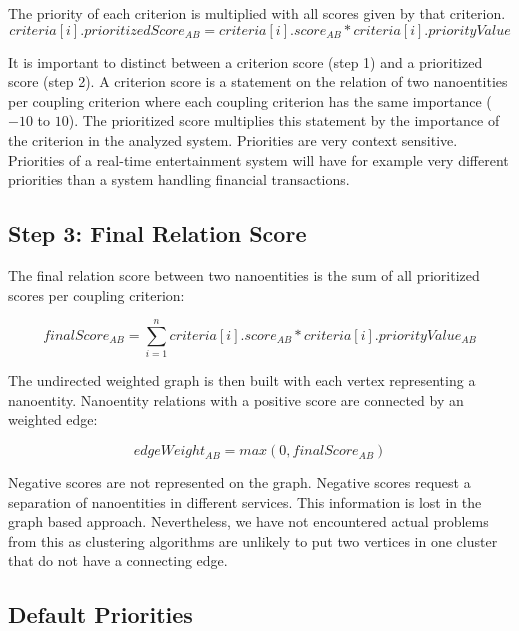 The priority of each criterion is multiplied with all scores given by that criterion. 
\begin{displaymath}
	criteria[i].prioritizedScore_{AB} = criteria[i].score_{AB} * criteria[i].priorityValue
\end{displaymath}

It is important to distinct between a criterion score (step 1) and a prioritized score (step 2). A criterion score is a statement on the relation of two nanoentities per coupling criterion where each coupling criterion has the same importance ($-10$ to $10$). The prioritized score multiplies this statement by the importance of the criterion in the analyzed system. Priorities are very context sensitive. Priorities of a real-time entertainment system will have for example very different priorities than a system handling financial transactions. 

\subsection{Step 3: Final Relation Score}

The final relation score between two nanoentities is the sum of all prioritized scores per coupling criterion: 

\begin{displaymath}
finalScore_{AB} = \sum\limits_{i=1}^n criteria[i].score_{AB} * criteria[i].priorityValue_{AB}
\end{displaymath}

The undirected weighted graph is then built with each vertex representing a nanoentity. Nanoentity relations with a positive score are connected by an weighted edge:

\begin{displaymath}
edgeWeight_{AB} = max(0, finalScore_{AB})	
\end{displaymath}

Negative scores are not represented on the graph. Negative scores request a separation of nanoentities in different services. This information is lost in the graph based approach. Nevertheless, we have not encountered actual problems from this as clustering algorithms are unlikely to put two vertices in one cluster that do not have a connecting edge.
	
\subsection{Default Priorities}
\label{sec:defaultPriorities}

